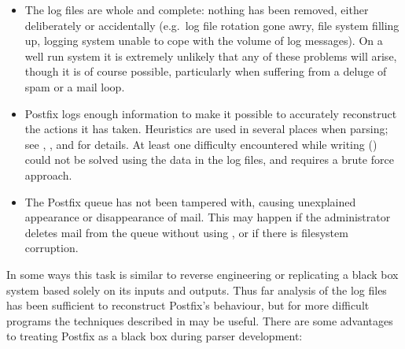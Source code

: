 \begin{itemize}

    \item The log files are whole and complete: nothing has been removed,
        either deliberately or accidentally (e.g.\ log file rotation gone
        awry, file system filling up, logging system unable to cope with
        the volume of log messages).  On a well run system it is extremely
        unlikely that any of these problems will arise, though it is of
        course possible, particularly when suffering from a deluge of spam
        or a mail loop.

    \item Postfix logs enough information to make it possible to accurately
        reconstruct the actions it has taken.  Heuristics are used in
        several places when parsing; see , , and
         for details.  At least
        one difficulty encountered while writing \parsername{}
        () could not be
        solved using the data in the log files, and requires a brute force
        approach.

    \item The Postfix queue has not been tampered with, causing unexplained
        appearance or disappearance of mail.  This may happen if the
        administrator deletes mail from the queue without using
        , or if there is filesystem corruption.

\end{itemize}

In some ways this task is similar to reverse engineering or replicating a
black box system based solely on its inputs and outputs.  Thus far
analysis of the log files has been sufficient to reconstruct Postfix's
behaviour, but for more difficult programs the techniques described in
\cite{black-box-error-reporting} may be useful.  There are some advantages
to treating Postfix as a black box during parser development:

